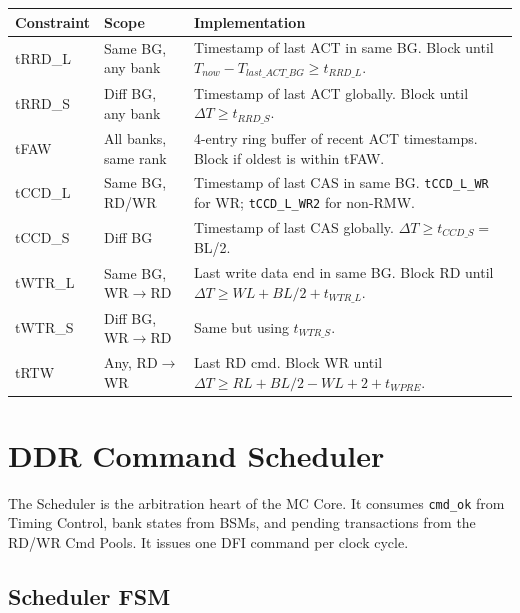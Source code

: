 \documentclass[10pt,a4paper]{article}
\newcommand{\Th}[1]{\cellcolor{cellbg}\textbf{\small #1}}
\newcommand{\RA}{\rowcolor{white}}
\newcommand{\RB}{\rowcolor{altbg}}
\begin{document}
\begin{center}
\begin{tabularx}{\linewidth}{@{} l l X @{}}
\toprule
\Th{Constraint} & \Th{Scope} & \Th{Implementation} \\
\midrule
\RA tRRD\_L & Same BG, any bank & Timestamp of last ACT in same BG. Block until $T_{now} - T_{last\_ACT\_BG} \geq t_{RRD\_L}$. \\
\RB tRRD\_S & Diff BG, any bank & Timestamp of last ACT globally. Block until $\Delta T \geq t_{RRD\_S}$. \\
\RA tFAW & All banks, same rank & 4-entry ring buffer of recent ACT timestamps. Block if oldest is within tFAW. \\
\RB tCCD\_L & Same BG, RD/WR & Timestamp of last CAS in same BG. \texttt{tCCD\_L\_WR} for WR; \texttt{tCCD\_L\_WR2} for non-RMW. \\
\RA tCCD\_S & Diff BG & Timestamp of last CAS globally. $\Delta T \geq t_{CCD\_S} = $ BL/2. \\
\RB tWTR\_L & Same BG, WR$\to$RD & Last write data end in same BG. Block RD until $\Delta T \geq WL+BL/2+t_{WTR\_L}$. \\
\RA tWTR\_S & Diff BG, WR$\to$RD & Same but using $t_{WTR\_S}$. \\
\RB tRTW & Any, RD$\to$WR & Last RD cmd. Block WR until $\Delta T \geq RL+BL/2 - WL + 2 + t_{WPRE}$. \\
\bottomrule
\end{tabularx}
\end{center}

\section{DDR Command Scheduler}

The Scheduler is the arbitration heart of the MC Core. It consumes \texttt{cmd\_ok} from
Timing Control, bank states from BSMs, and pending transactions from the RD/WR Cmd Pools.
It issues one DFI command per clock cycle.

\subsection{Scheduler FSM}
\end{document}
